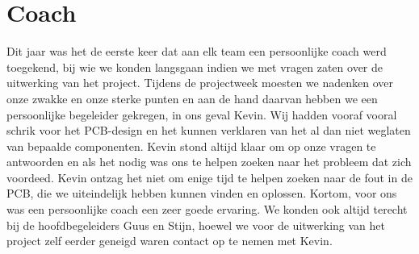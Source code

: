 \chapter{Coach}
Dit jaar was het de eerste keer dat aan elk team een persoonlijke coach werd toegekend, bij wie we konden langsgaan indien we met vragen zaten over de uitwerking van het project. Tijdens de projectweek moesten we nadenken over onze zwakke en onze sterke punten en aan de hand daarvan hebben we een persoonlijke begeleider gekregen, in ons geval Kevin. Wij hadden vooraf vooral schrik voor het PCB-design en het kunnen verklaren van het al dan niet weglaten van bepaalde componenten. Kevin stond altijd klaar om op onze vragen te antwoorden en als het nodig was ons te helpen zoeken naar het probleem dat zich voordeed. Kevin ontzag het niet om enige tijd te helpen zoeken naar de fout in de PCB, die we uiteindelijk hebben kunnen vinden en oplossen. Kortom, voor ons was een persoonlijke coach een zeer goede ervaring. We konden ook altijd terecht bij de hoofdbegeleiders Guus en Stijn, hoewel we voor de uitwerking van het project zelf eerder geneigd waren contact op te nemen met Kevin.